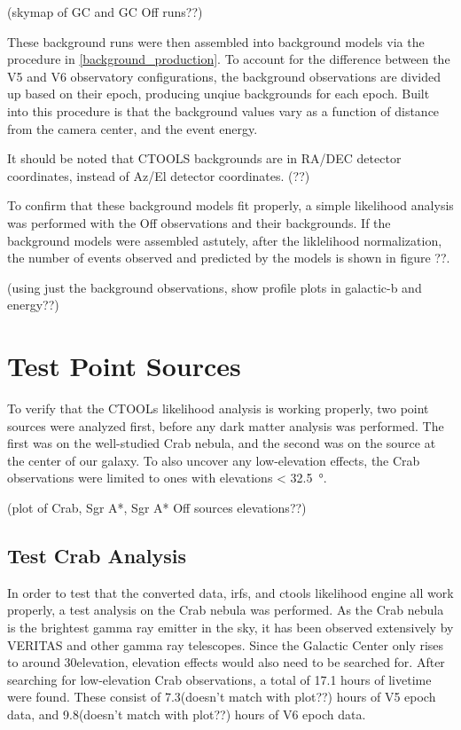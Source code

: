   (skymap of GC and GC Off runs??)

  These background runs were then assembled into background models via the procedure in \ref{background_production}.
  To account for the difference between the V5 and V6 observatory configurations, the background observations are divided up based on their epoch, producing unqiue backgrounds for each epoch.
  Built into this procedure is that the background values vary as a function of distance from the camera center, and the event energy.

  It should be noted that CTOOLS backgrounds are in RA/DEC detector coordinates, instead of Az/El detector coordinates. (??)

  To confirm that these background models fit properly, a simple likelihood analysis was performed with the Off observations and their backgrounds.
  If the background models were assembled astutely, after the liklelihood normalization, the number of events observed and predicted by the models is shown in figure ??.

  (using just the background observations, show profile plots in galactic-b and energy??)

\section{Test Point Sources}
  To verify that the CTOOLs likelihood analysis is working properly, two point sources were analyzed first, before any dark matter analysis was performed.
  The first was on the well-studied Crab nebula, and the second was on the source at the center of our galaxy.
  To also uncover any low-elevation effects, the Crab observations were limited to ones with elevations < \SI{32.5}{\degree}.

  (plot of Crab, Sgr A*, Sgr A* Off sources elevations??)

  \subsection{Test Crab Analysis}

    In order to test that the converted data, irfs, and ctools likelihood engine all work properly, a test analysis on the Crab nebula was performed.
    As the Crab nebula is the brightest gamma ray emitter in the sky, it has been observed extensively by VERITAS and other gamma ray telescopes.
    Since the Galactic Center only rises to around 30\degree elevation, elevation effects would also need to be searched for.
    After searching for low-elevation Crab observations, a total of 17.1 hours of livetime were found.
    These consist of 7.3(doesn't match with plot??) hours of V5 epoch data, and 9.8(doesn't match with plot??) hours of V6 epoch data.
    
